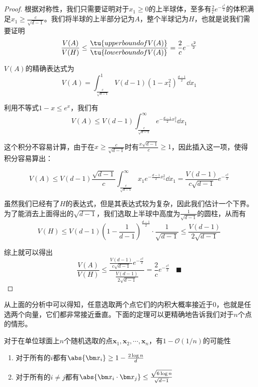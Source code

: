 \documentclass[UTF8]{ctexbook}
\begin{document}
\begin{proof}
根据对称性，我们只需要证明对于$x_1 \ge 0$的上半球体，至多有$\frac{2}{c}e^{-\frac{c^2}{2}}$的体积满足$x_1 \ge \frac{c}{\sqrt{d-1}}$。我们将半球的上半部分记为$A$，整个半球记为$H$，也就是说我们需要证明
\begin{equation}
	\frac{V(A)}{V(H)} \le \frac{\tu{upper bound of V(A)}}{\tu{lower bound of V(A)}} = \frac{2}{c}e^{-\frac{c^2}{2}}
\end{equation}

$V(A)$的精确表达式为
\begin{equation}
	V(A) = \int_{\frac{c}{\sqrt{d-1}}}^{1} V(d-1) (1-x_1^2)^{\frac{d-1}{2}} \dd x_1
\end{equation}

利用不等式$1-x \le e^{x}$，我们有
\begin{equation}
V(A) \le V(d-1)\int_{\frac{c}{\sqrt{d-1}}}^{\infty} e^{-\frac{d-1}{2}x_1^2}  \dd x_1
\end{equation}

这个积分不容易计算，由于在$x \ge \frac{c}{\sqrt{d-1}}$时有$\frac{x\sqrt{d-1}}{c} \ge 1$，因此插入这一项，使得积分容易算出：

\begin{equation}
V(A) \le V(d-1) \frac{\sqrt{d-1}}{c}\int_{\frac{c}{\sqrt{d-1}}}^{\infty} x_1 e^{-\frac{d-1}{2}x_1^2} \dd x_1 = \frac{V(d-1)}{c\sqrt{d-1}} e^{-\frac{c^2}{2}}
\end{equation}

虽然我们已经有了$H$的表达式，但是其表达式较为复杂，因此我们估计一个下界。为了能消去上面得出的$\sqrt{d-1}$，我们选取上半球中高度为$\frac{1}{\sqrt{d-1}}$的圆柱，从而有
\begin{equation}
	V(H) \le V(d-1)(1-\frac{1}{d-1})^{\frac{d-1}{2}} \cdot \frac{1}{\sqrt{d-1}} \le \frac{V(d-1)}{2\sqrt{d-1}}
\end{equation}

综上就可以得出
\begin{equation}
	\frac{V(A)}{V(H)} \le \frac{ \frac{V(d-1)}{c\sqrt{d-1}} e^{-\frac{c^2}{2}}}{\frac{V(d-1)}{2\sqrt{d-1}}} = \frac{2}{c}e^{-\frac{c^2}{2}} \ \ \ \ \blacksquare
\end{equation}

\end{proof}


从上面的分析中可以得知，任意选取两个点它们的内积大概率接近于$0$，也就是任选两个向量，它们都非常接近垂直。下面的定理可以更精确地告诉我们对于$n$个点的情形。

\begin{thm}
对于在单位球面上$n$个随机选取的点$\bm x_1, \bm x_2, \cdots, \bm x_n$，有$1-\mathcal{O}(1/n)$的可能性
\begin{enumerate}
\item
对于所有的$i$都有$\abs{\bm x_i} \ge 1-\frac{2\log n}{d}$
\item
对于所有的$i\ne j$都有$\abs{\bm x_i \cdot \bm x_j} \le \frac{\sqrt{6\log n}}{\sqrt{d-1}}$
\end{enumerate}

\end{thm}
\end{document}
